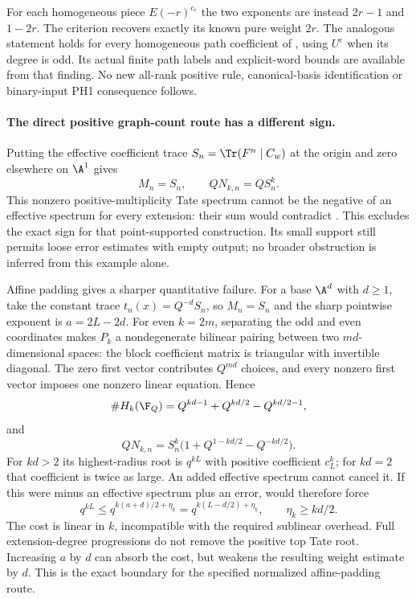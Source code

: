 For each homogeneous piece $E(-r)^{c_r}$ the two exponents
are instead $2r-1$ and $1-2r$. The criterion recovers
exactly its known pure weight $2r$. The analogous statement
holds for every homogeneous path coefficient of ,
using $U^e$ when its degree is odd. Its actual finite path
labels and explicit-word bounds are available from that
finding. No new all-rank positive rule, canonical-basis
identification or binary-input PH1 consequence follows.

\paragraph{The direct positive graph-count route has a different sign.}
Putting the effective coefficient trace $S_n=\Tr(F^n\mid C_w)$
at the origin and zero elsewhere on $\A^1$ gives
\[
 M_n=S_n,\qquad QN_{k,n}=QS_n^k.
\]
This nonzero positive-multiplicity Tate spectrum cannot be
the negative of an effective spectrum for every extension:
their sum would contradict . This excludes the
exact sign for that point-supported construction. Its
small support still permits loose error estimates with
empty output; no broader  obstruction is inferred
from this example alone.

Affine padding gives a sharper quantitative failure.
For a base $\A^d$ with $d\ge1$, take the constant trace
$t_n(x)=Q^{-d}S_n$, so $M_n=S_n$ and the sharp pointwise
exponent is $a=2L-2d$. For even $k=2m$, separating the
odd and even coordinates makes $P_k$ a nondegenerate
bilinear pairing between two $md$-dimensional spaces:
the block coefficient matrix is triangular with invertible
diagonal. The zero first vector contributes $Q^{md}$
choices, and every nonzero first vector imposes one
nonzero linear equation. Hence
\[
 \#H_k(\F_Q)=Q^{kd-1}+Q^{kd/2}-Q^{kd/2-1},
\]
and
\[
 QN_{k,n}=S_n^k
             \bigl(1+Q^{1-kd/2}-Q^{-kd/2}\bigr).
\]
For $kd>2$ its highest-radius root is $q^{kL}$ with
positive coefficient $c_L^k$; for $kd=2$ that coefficient
is twice as large. An added effective spectrum cannot
cancel it. If this were minus an effective spectrum plus
an  error,  would therefore force
\[
 q^{kL}\le q^{k(a+d)/2+\eta_k}
              =q^{k(L-d/2)+\eta_k},
 \qquad \eta_k\ge kd/2.
\]
The cost is linear in $k$, incompatible with the required
sublinear overhead. Full extension-degree progressions
do not remove the positive top Tate root.
Increasing $a$ by $d$ can absorb the cost, but weakens
the resulting weight estimate by $d$. This is the exact
boundary for the specified normalized affine-padding route.

